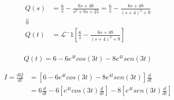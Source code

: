 \documentclass{article}
\begin{document}
\begin{align*}
    Q\left(s\right) &= \frac{6}{s} - \frac{6s + 48}{s^2 + 8s + 25} = \frac{6}{s} - \frac{6s + 48}{\left(s+4\right)^2 + 9} \\
    \Downarrow \\
    Q\left(t\right) &= \mathcal{L}^-1 \left[\frac{6}{s} - \frac{6s + 48}{\left(s+4\right)^2 + 9}\right] \\
\end{align*}

\begin{align*}
    \boxed{
        Q\left(t\right) = 6 - 6 e^{4t} cos\left(3t\right) - 8 e^{4t} sen \left(3t\right)
    }
\end{align*}

\begin{align*}
    I = \frac{d Q}{d t} &= \left[6 - 6 e^{4t} cos\left(3t\right) - 8 e^{4t} sen \left(3t\right)\right] \frac{d}{dt} \\
    &= 6 \frac{d}{dt} - 6 \left[e^{4t} cos\left(3t\right) \frac{d}{dt}\right] - 8 \left[e^{4t} sen \left(3t\right) \frac{d}{dt}\right] \\
\end{align*}
\end{document}
